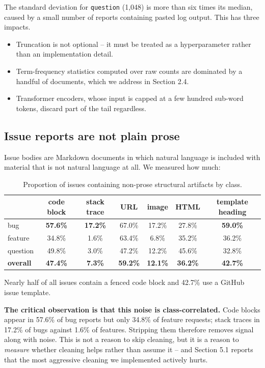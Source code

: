 The standard deviation for \texttt{question} (1,048) is more than six times its median, caused by a small number of reports containing pasted log output. This has three impacts. 
\begin{itemize}
    \item Truncation is not optional -- it must be treated as a hyperparameter rather than an implementation detail.
    \item Term-frequency statistics computed over raw counts are dominated by a handful of documents, which we address in Section 2.4.
    \item Transformer encoders, whose input is capped at a few hundred sub-word tokens, discard part of the tail regardless.
\end{itemize}

\subsection{Issue reports are not plain prose}

Issue bodies are Markdown documents in which natural language is included with material that is not natural language at all. We measured how much:

\begin{table}[h]
\centering
\caption{Proportion of issues containing non-prose structural artifacts by class.}
\label{tab:non_prose_content}
\vspace{0.5em}
\begin{tabular}{l c c c c c c}
\hline
 & code block & stack trace & URL & image & HTML & template heading \\
\hline
bug & \textbf{57.6\%} & \textbf{17.2\%} & 67.0\% & 17.2\% & 27.8\% & \textbf{59.0\%} \\
feature & 34.8\% & 1.6\% & 63.4\% & 6.8\% & 35.2\% & 36.2\% \\
question & 49.8\% & 3.0\% & 47.2\% & 12.2\% & 45.6\% & 32.8\% \\
\textbf{overall} & \textbf{47.4\%} & \textbf{7.3\%} & \textbf{59.2\%} & \textbf{12.1\%} & \textbf{36.2\%} & \textbf{42.7\%} \\
\hline
\end{tabular}
\end{table}

Nearly half of all issues contain a fenced code block and 42.7\% use a GitHub issue template.

\textbf{The critical observation is that this noise is class-correlated.} Code blocks appear in 57.6\% of bug reports but only 34.8\% of feature requests; stack traces in 17.2\% of bugs against 1.6\% of features. Stripping them therefore removes signal along with noise. This is not a reason to skip cleaning, but it is a reason to \textit{measure} whether cleaning helps rather than assume it -- and Section 5.1 reports that the most aggressive cleaning we implemented actively hurts.

